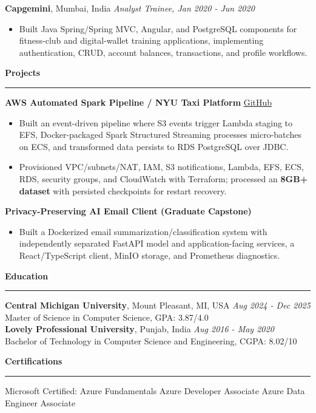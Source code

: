\documentclass[11pt,letterpaper]{article}
\newcommand{\ressection}[1]{\Needspace{6\baselineskip}\vspace{8pt}\par\textbf{#1}\par\vspace{2pt}\hrule\vspace{5pt}}
\begin{document}
\textbf{Capgemini}, Mumbai, India \hfill \textit{Analyst Trainee, Jan 2020 - Jun 2020}
\begin{itemize}
  \item Built Java Spring/Spring MVC, Angular, and PostgreSQL components for fitness-club and digital-wallet training applications, implementing authentication, CRUD, account balances, transactions, and profile workflows.
\end{itemize}

\ressection{Projects}
\textbf{AWS Automated Spark Pipeline / NYU Taxi Platform} \hfill \href{https://github.com/preferablehuman/AWS-automated-spark-pipeline}{GitHub}
\begin{itemize}
  \item Built an event-driven pipeline where S3 events trigger Lambda staging to EFS, Docker-packaged Spark Structured Streaming processes micro-batches on ECS, and transformed data persists to RDS PostgreSQL over JDBC.
  \item Provisioned VPC/subnets/NAT, IAM, S3 notifications, Lambda, EFS, ECS, RDS, security groups, and CloudWatch with Terraform; processed an \textbf{8GB+ dataset} with persisted checkpoints for restart recovery.
\end{itemize}
\vspace{2pt}
\textbf{Privacy-Preserving AI Email Client (Graduate Capstone)}
\begin{itemize}
  \item Built a Dockerized email summarization/classification system with independently separated FastAPI model and application-facing services, a React/TypeScript client, MinIO storage, and Prometheus diagnostics.
\end{itemize}

\ressection{Education}
\textbf{Central Michigan University}, Mount Pleasant, MI, USA \hfill \textit{Aug 2024 - Dec 2025}\\
Master of Science in Computer Science, GPA: 3.87/4.0\\
\textbf{Lovely Professional University}, Punjab, India \hfill \textit{Aug 2016 - May 2020}\\
Bachelor of Technology in Computer Science and Engineering, CGPA: 8.02/10

\ressection{Certifications}
Microsoft Certified: Azure Fundamentals \textbar{} Azure Developer Associate \textbar{} Azure Data Engineer Associate
\end{document}
